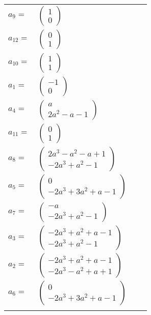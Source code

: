 \documentclass[1p]{elsarticle_modified}
\theoremstyle{definition}
\begin{document}
\begin{tabular}{m{7pt} m{180pt} m{7pt} m{180pt} }
\flushright $a_{9}=$&$\begin{pmatrix}1\\0\end{pmatrix}$ \\
\flushright $a_{12}=$&$\begin{pmatrix}0\\1\end{pmatrix}$ \\
\flushright $a_{10}=$&$\begin{pmatrix}1\\1\end{pmatrix}$ \\
\flushright $a_{1}=$&$\begin{pmatrix}-1\\0\end{pmatrix}$ \\
\flushright $a_{4}=$&$\begin{pmatrix}a\\2 a^2- a-1\end{pmatrix}$ \\
\flushright $a_{11}=$&$\begin{pmatrix}0\\1\end{pmatrix}$ \\
\flushright $a_{8}=$&$\begin{pmatrix}2 a^3- a^2- a+1\\-2 a^3+a^2-1\end{pmatrix}$ \\
\flushright $a_{5}=$&$\begin{pmatrix}0\\-2 a^3+3 a^2+a-1\end{pmatrix}$ \\
\flushright $a_{7}=$&$\begin{pmatrix}- a\\-2 a^3+a^2-1\end{pmatrix}$ \\
\flushright $a_{3}=$&$\begin{pmatrix}-2 a^3+a^2+a-1\\-2 a^3+a^2-1\end{pmatrix}$ \\
\flushright $a_{2}=$&$\begin{pmatrix}-2 a^3+a^2+a-1\\-2 a^3- a^2+a+1\end{pmatrix}$ \\
\flushright $a_{6}=$&$\begin{pmatrix}0\\-2 a^3+3 a^2+a-1\end{pmatrix}$\\&\end{tabular}
\end{document}
